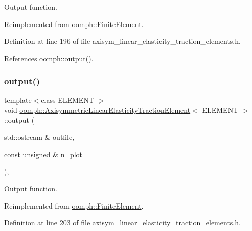 Output function. 



Reimplemented from \hyperlink{classoomph_1_1FiniteElement_a2ad98a3d2ef4999f1bef62c0ff13f2a7}{oomph\+::\+Finite\+Element}.



Definition at line 196 of file axisym\+\_\+linear\+\_\+elasticity\+\_\+traction\+\_\+elements.\+h.



References oomph\+::output().

\mbox{\label{classoomph_1_1AxisymmetricLinearElasticityTractionElement_ad2f848b61c90a1c1424ad0480eee4ba0}} 
\subsubsection{\texorpdfstring{output()}{output()}\hspace{0.1cm}{\footnotesize\ttfamily [2/4]}}
{\footnotesize\ttfamily template$<$class E\+L\+E\+M\+E\+NT $>$ \\
void \hyperlink{classoomph_1_1AxisymmetricLinearElasticityTractionElement}{oomph\+::\+Axisymmetric\+Linear\+Elasticity\+Traction\+Element}$<$ E\+L\+E\+M\+E\+NT $>$\+::output (\begin{DoxyParamCaption}\item[{std\+::ostream \&}]{outfile,  }\item[{const unsigned \&}]{n\+\_\+plot }\end{DoxyParamCaption})\hspace{0.3cm}{\ttfamily [inline]}, {\ttfamily [virtual]}}



Output function. 



Reimplemented from \hyperlink{classoomph_1_1FiniteElement_afa9d9b2670f999b43e6679c9dd28c457}{oomph\+::\+Finite\+Element}.



Definition at line 203 of file axisym\+\_\+linear\+\_\+elasticity\+\_\+traction\+\_\+elements.\+h.



